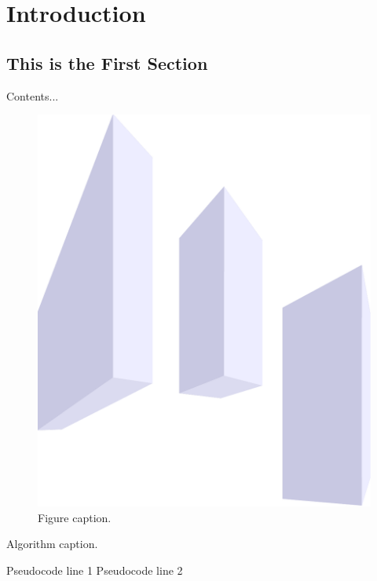 \chapter{Introduction} \label{sec: introduction}
\setcounter{page}{1}
\renewcommand{\thepage}{\arabic{page}} %


\section{This is the First Section}
Contents...

\begin{figure}[!hbp]
    \centering
    \includegraphics[scale=0.4]{figures/drawing.pdf}
    \caption{Figure caption.}
    \label{fig: figure_name}
\end{figure}

\begin{algorithm}[!hbt]
    \caption{Algorithm caption.}
    \label{alg: alg_name}
    \begin{algorithmic}
        \State Pseudocode line 1
        \State Pseudocode line 2
    \end{algorithmic}
\end{algorithm}

